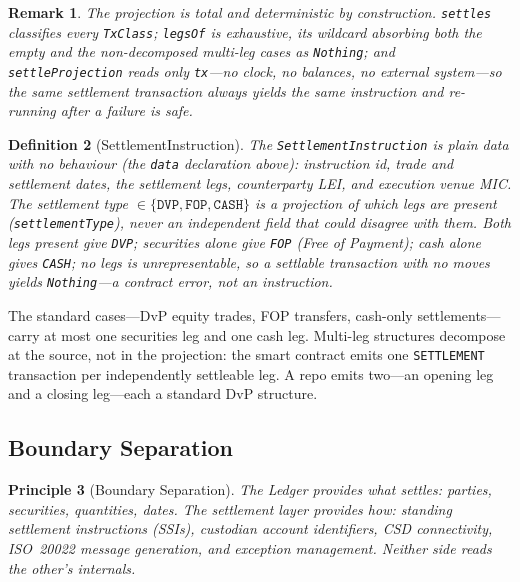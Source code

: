 \documentclass[11pt,a4paper]{article}
\newtheorem{definition}{Definition}[section]
\newtheorem{principle}[definition]{Principle}
\newtheorem{remark}[definition]{Remark}
\begin{document}
\begin{remark}
The projection is total and deterministic by construction. \texttt{settles} classifies every \texttt{TxClass}; \texttt{legsOf} is exhaustive, its wildcard absorbing both the empty and the non-decomposed multi-leg cases as \texttt{Nothing}; and \texttt{settleProjection} reads only \texttt{tx}---no clock, no balances, no external system---so the same settlement transaction always yields the same instruction and re-running after a failure is safe.
\end{remark}

\begin{definition}[SettlementInstruction]
\label{def:settlement-instruction}
The \texttt{SettlementInstruction} is plain data with no behaviour (the \texttt{data} declaration above): instruction id, trade and settlement dates, the settlement legs, counterparty LEI, and execution venue MIC. The settlement type $\in \{\texttt{DVP}, \texttt{FOP}, \texttt{CASH}\}$ is a \emph{projection} of which legs are present (\texttt{settlementType}), never an independent field that could disagree with them. Both legs present give \texttt{DVP}; securities alone give \texttt{FOP} (Free of Payment); cash alone gives \texttt{CASH}; no legs is unrepresentable, so a settlable transaction with no moves yields \texttt{Nothing}---a contract error, not an instruction.
\end{definition}

The standard cases---DvP equity trades, FOP transfers, cash-only settlements---carry at most one securities leg and one cash leg. Multi-leg structures decompose at the source, not in the projection: the smart contract emits one \texttt{SETTLEMENT} transaction per independently settleable leg. A repo emits two---an opening leg and a closing leg---each a standard DvP structure.

\subsection{Boundary Separation}
\label{sec:settlement-boundary}

\begin{principle}[Boundary Separation]
\label{prin:settlement-boundary}
The Ledger provides \emph{what} settles: parties, securities, quantities, dates. The settlement layer provides \emph{how}: standing settlement instructions (SSIs), custodian account identifiers, CSD connectivity, ISO~20022 message generation, and exception management. Neither side reads the other's internals.
\end{principle}
\end{document}
